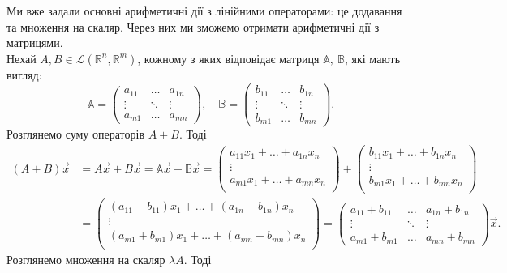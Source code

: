 \documentclass{math_library}
\begin{document}
	Ми вже задали основні арифметичні дії з лінійними операторами: це додавання та множення на скаляр. Через них ми зможемо отримати арифметичні дії з матрицями.\\
	Нехай $A,B \in \mathcal{L}(\mathbb{R}^n,\mathbb{R}^m)$, кожному з яких відповідає матриця $\mathbb{A},\ \mathbb{B}$, які мають вигляд:
	\[
	\mathbb{A} = \begin{pmatrix}
	a_{11} & \dots & a_{1n} \\
	\vdots & \ddots & \vdots \\
	a_{m1} & \dots & a_{mn}
	\end{pmatrix}, \quad \mathbb{B} = \begin{pmatrix}
	b_{11} & \dots & b_{1n} \\
	\vdots & \ddots & \vdots \\
	b_{m1} & \dots & b_{mn}
	\end{pmatrix}.
	\]
	Розглянемо суму операторів $A+B$. Тоді
	\begin{align*}
	(A+B)\vec{x} & = A \vec{x} + B \vec{x} = \mathbb{A} \vec{x} + \mathbb{B} \vec{x} = \begin{pmatrix}
	a_{11}x_1 + \dots + a_{1n} x_n \\
	\vdots \\
	a_{m1}x_1 + \dots + a_{mn} x_n \\
	\end{pmatrix} + \begin{pmatrix}
	b_{11}x_1 + \dots + b_{1n} x_n \\
	\vdots \\
	b_{m1}x_1 + \dots + b_{mn} x_n \\
	\end{pmatrix} \\
	& = \begin{pmatrix}
	(a_{11}+b_{11})x_1 + \dots + (a_{1n}+b_{1n}) x_n \\
	\vdots \\
	(a_{m1} + b_{m1})x_1 + \dots + (a_{mn}+b_{mn}) x_n \\
	\end{pmatrix} = \begin{pmatrix}
	a_{11} + b_{11} & \dots & a_{1n} + b_{1n} \\
	\vdots & \ddots & \vdots \\
	a_{m1} + b_{m1} & \dots & a_{mn} + b_{mn}
	\end{pmatrix} \vec{x}.
	\end{align*}
	Розглянемо множення на скаляр $\lambda A$. Тоді
\end{document}
